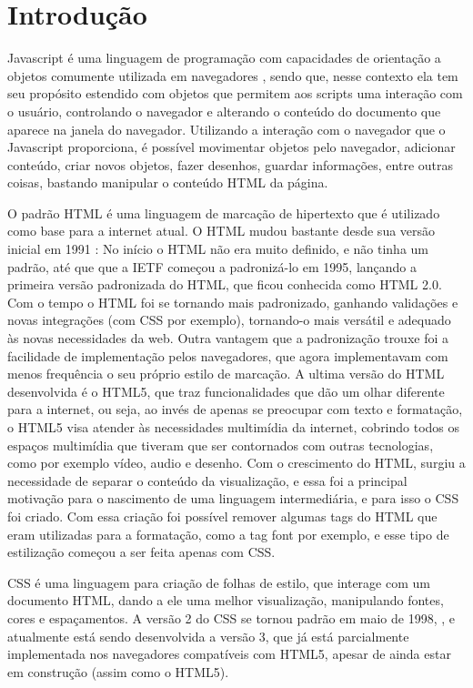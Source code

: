 \section{Introdução}

Javascript é uma linguagem de programação com capacidades de orientação a objetos comumente utilizada em
navegadores \cite{flanagan2006javascript}, sendo que, nesse contexto ela tem seu propósito estendido com objetos que permitem
aos scripts uma interação com o usuário, controlando o navegador e alterando o conteúdo
do documento que aparece na janela do navegador.
Utilizando a interação com o navegador que o Javascript proporciona, é possível movimentar
objetos pelo navegador, adicionar conteúdo, criar novos objetos, fazer desenhos, guardar
informações, entre outras coisas, bastando manipular o conteúdo HTML da página.

O padrão HTML é uma linguagem de marcação de hipertexto que é utilizado como base para a internet
atual. O HTML mudou bastante desde sua versão inicial em 1991
\cite{powell2003html}: No início o HTML não era muito definido, e não tinha um padrão, até que que a
IETF começou a padronizá-lo em 1995, lançando a
primeira versão padronizada do HTML, que ficou conhecida como HTML 2.0.
Com o tempo o HTML foi se tornando mais padronizado, ganhando validações e novas integrações
(com CSS por exemplo), tornando-o mais versátil e adequado às novas necessidades da
web. Outra vantagem que a padronização trouxe foi a facilidade de implementação pelos
navegadores, que agora implementavam com menos frequência o seu próprio estilo de marcação.
A ultima versão do HTML desenvolvida é o HTML5, que traz funcionalidades que dão um
olhar diferente para a internet, ou seja, ao invés de apenas se preocupar com texto
e formatação, o HTML5 visa atender às necessidades multimídia da internet, cobrindo
todos os espaços multimídia que tiveram que ser contornados com outras tecnologias,
como por exemplo vídeo, audio e desenho.
Com o crescimento do HTML, surgiu a necessidade de separar o conteúdo
da visualização, e essa foi a principal motivação para o nascimento de
uma linguagem intermediária, e para isso o CSS foi criado.
Com essa criação foi possível remover algumas tags do HTML que eram utilizadas
para a formatação, como a tag font por exemplo, e esse tipo de
estilização começou a ser feita apenas com CSS.

CSS é uma linguagem para criação de folhas de estilo, que interage com um documento
HTML, dando a ele uma melhor visualização, manipulando fontes, cores e espaçamentos.
A versão 2 do CSS se tornou padrão em maio de 1998, \cite{zeldman2009designing},
e atualmente está sendo desenvolvida a versão 3, que já está parcialmente implementada
nos navegadores compatíveis com HTML5, apesar de ainda estar em construção (assim como o HTML5).

